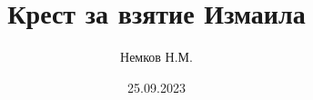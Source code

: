 

\title{Крест за взятие Измаила}
\author{Немков Н.М.}
\date{25.09.2023}



\begin{frame}
\maketitle
\end{frame}

\section{}

